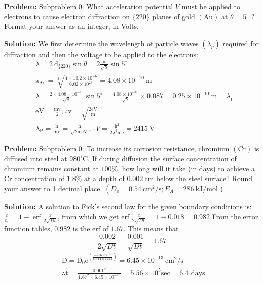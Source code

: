 \documentclass[10pt]{article}
\begin{document}
\textbf{Problem:}
Subproblem 0: What acceleration potential $V$ must be applied to electrons to cause electron diffraction on $\{220\}$ planes of gold $(\mathrm{Au})$ at $\theta=5^{\circ}$ ? Format your answer as an integer, in Volts.


\textbf{Solution:}
We first determine the wavelength of particle waves $\left(\lambda_{p}\right)$ required for diffraction and then the voltage to be applied to the electrons:
\[
\begin{aligned}
&\lambda=2 \mathrm{~d}_{\{220\}} \sin \theta=2 \frac{\mathrm{a}}{\sqrt{8}} \sin 5^{\circ} \\
&\mathrm{a}_{\mathrm{Au}}=\sqrt[3]{\frac{4 \times 10.2 \times 10^{-6}}{6.02 \times 10^{23}}}=4.08 \times 10^{-10} \mathrm{~m} \\
&\lambda=\frac{2 \times 4.08 \times 10^{-10}}{\sqrt{8}} \sin 5^{\circ}=\frac{4.08 \times 10^{-10}}{\sqrt{2}} \times 0.087=0.25 \times 10^{-10} \mathrm{~m}=\lambda_{\mathrm{p}} \\
&\mathrm{eV}=\frac{\mathrm{mv}}{2}, \therefore \mathrm{v}=\sqrt{\frac{2 \mathrm{eV}}{\mathrm{m}}} \\
&\lambda_{\mathrm{P}}=\frac{\mathrm{h}}{\mathrm{mv}}=\frac{\mathrm{h}}{\sqrt{2 \mathrm{meV}}}, \therefore V=\frac{\mathrm{h}^{2}}{2 \lambda^{2} \mathrm{me}}= \boxed{2415} \mathrm{~V}
\end{aligned}
\]


\textbf{Problem:}
Subproblem 0: To increase its corrosion resistance, chromium $(\mathrm{Cr})$ is diffused into steel at $980^{\circ} \mathrm{C}$. If during diffusion the surface concentration of chromium remains constant at $100 \%$, how long will it take (in days) to achieve a $\mathrm{Cr}$ concentration of $1.8 \%$ at a depth of $0.002 \mathrm{~cm}$ below the steel surface? Round your answer to 1 decimal place. $\left(D_{o}=0.54 \mathrm{~cm}^{2} / \mathrm{s} ; E_{A}=286 \mathrm{~kJ} / \mathrm{mol}\right.$ ) 


\textbf{Solution:}
A solution to Fick's second law for the given boundary conditions is:
$\frac{c}{c_{s}}=1-\operatorname{erf} \frac{x}{2 \sqrt{D t}}$, from which we get erf $\frac{x}{2 \sqrt{D t}}=1-0.018=0.982$
From the error function tables, $0.982$ is the erf of $1.67$. This means that
\[
\frac{0.002}{2 \sqrt{D t}}=\frac{0.001}{\sqrt{D t}}=1.67
\]
\[
\begin{aligned}
& \mathrm{D}=\mathrm{D}_{0} \mathrm{e}^{\left(\frac{-286 \times 10^{5}}{8.314 \times 1253}\right)}=6.45 \times 10^{-13} \mathrm{~cm}^{2} / \mathrm{s} \\
& \therefore \mathrm{t}=\frac{0.001^{2}}{1.67^{2} \times 6.45 \times 10^{-13}}=5.56 \times 10^{5} \mathrm{sec}=\boxed{6.4} \text { days }
\end{aligned}
\]
\end{document}
